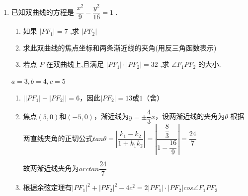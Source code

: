 \begin{enumerate}
\begin{enumerate}
        
        \item 已知双曲线的方程是 $\dfrac{{x}^{2}}{9} - \dfrac{{y}^{2}}{16} = 1$ .
        \begin{enumerate}
            \item 如果 $\left| {P{F}_{1}}\right|  = 7$ ,求 $\left| {P{F}_{2}}\right|$
            \item 求此双曲线的焦点坐标和两条渐近线的夹角(用反三角函数表示)
            \item 若点 $P$ 在双曲线上,且满足 $\left| {P{F}_{1}}\right|  \cdot  \left| {P{F}_{2}}\right|  = {32}$ ,求 $\angle {F}_{1}P{F}_{2}$ 的大小.
        \end{enumerate}
        \begin{jieda}
            $a = 3, b = 4, c = 5$
            \begin{enumerate}
                \item $\left| \left| {P{F}_{1}}\right| - \left| {P{F}_{2}}\right| \right| = 6$，因此$\left| {P{F}_{2}}\right| = 13$或$1$（舍）
                \item 焦点$(5, 0)$和$(-5, 0)$，渐近线为$y = \pm \dfrac{4}{3}x$，设两渐近线的夹角为$\theta$
                根据两直线夹角的正切公式$tan\theta = \left|\dfrac{k_1 - k_2}{1+k_1k_2}\right| = \left|\dfrac{\dfrac{8}{3}}{1 - \dfrac{16}{9}}\right| = \dfrac{24}{7}$
                
                故两渐近线夹角为$arctan\dfrac{24}{7}$
                \item 根据余弦定理有$|PF_1|^2 + |PF_2|^2 - 4c^2 = 2\left| {P{F}_{1}}\right|  \cdot  \left| {P{F}_{2}}\right|cos\angle {F}_{1}P{F}_{2}$
                

\end{enumerate}
\end{jieda}
\end{enumerate}
\end{enumerate}
